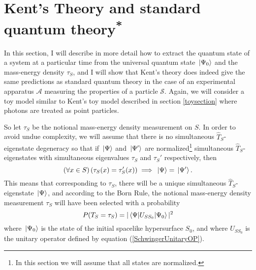 \section{Kent's Theory and standard quantum theory\textsuperscript{*}\label{KentconsistentQT}}
In this section, I will describe in more detail how to extract the quantum state of a system at a particular time from the universal quantum state $\ket*{\Psi_0}$ and the mass-energy density $\tau_S$, and I will show that Kent's theory does indeed give the same predictions as standard quantum theory in the case of an experimental apparatus $\mathcal{A}$ measuring the properties of a particle $\mathcal{S}$. Again, we will consider a toy model similar to Kent's toy model described in section \ref{toysection} where photons are treated as point particles.

So let $\tau_S$ be the notional mass-energy density measurement on $S$. In order to avoid undue complexity, we will assume that there is no simultaneous $\hat{T}_S$-eigenstate degeneracy so that if $\ket*{\Psi}$ and $\ket*{\Psi'}$ are normalized\footnote{In this section we will assume that all states are normalized.} simultaneous $\hat{T}_S$-eigenstates with simultaneous eigenvalues $\tau_S$ and $\tau_S'$ respectively, then
$$(\forall x\in S) \,(\tau_S(x)=\tau_S'(x))\implies \ket*{\Psi}=\ket*{\Psi'}.$$
This means that corresponding to $\tau_S$, there will be a unique simultaneous $\hat{T}_S$-eigenstate $\ket*{\Psi}$, and according to the Born Rule, the notional mass-energy density measurement $\tau_S$ will have been selected with a probability 
$$P(T_S = \tau_S)=|\mel{\Psi}{U_{SS_0}}{\Psi_0}|^2$$
where $\ket*{\Psi_0}$ is the state of the initial spacelike hypersurface $S_0$, and where $U_{SS_0}$ is the unitary operator defined by equation (\ref{SchwingerUnitaryOP}).

